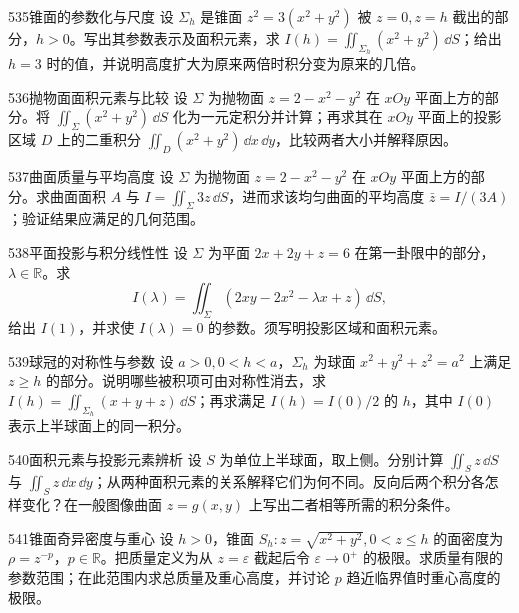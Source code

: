 \begin{exercise}{535}{锥面的参数化与尺度}
设 $\Sigma_h$ 是锥面 $z^2=3(x^2+y^2)$ 被 $z=0,z=h$ 截出的部分，$h>0$。写出其参数表示及面积元素，求 $I(h)=\iint_{\Sigma_h}(x^2+y^2)\,\dd S$；给出 $h=3$ 时的值，并说明高度扩大为原来两倍时积分变为原来的几倍。
\end{exercise}
\begin{exercise}{536}{抛物面面积元素与比较}
设 $\Sigma$ 为抛物面 $z=2-x^2-y^2$ 在 $xOy$ 平面上方的部分。将 $\iint_{\Sigma}(x^2+y^2)\,\dd S$ 化为一元定积分并计算；再求其在 $xOy$ 平面上的投影区域 $D$ 上的二重积分 $\iint_D(x^2+y^2)\,\dd x\,\dd y$，比较两者大小并解释原因。
\end{exercise}
\begin{exercise}{537}{曲面质量与平均高度}
设 $\Sigma$ 为抛物面 $z=2-x^2-y^2$ 在 $xOy$ 平面上方的部分。求曲面面积 $A$ 与 $I=\iint_{\Sigma}3z\,\dd S$，进而求该均匀曲面的平均高度 $\bar z=I/(3A)$；验证结果应满足的几何范围。
\end{exercise}
\begin{exercise}{538}{平面投影与积分线性性}
设 $\Sigma$ 为平面 $2x+2y+z=6$ 在第一卦限中的部分，$\lambda\in\mathbb R$。求
\[I(\lambda)=\iint_{\Sigma}(2xy-2x^2-\lambda x+z)\,\dd S,\]
给出 $I(1)$，并求使 $I(\lambda)=0$ 的参数。须写明投影区域和面积元素。
\end{exercise}
\begin{exercise}{539}{球冠的对称性与参数}
设 $a>0,0<h<a$，$\Sigma_h$ 为球面 $x^2+y^2+z^2=a^2$ 上满足 $z\ge h$ 的部分。说明哪些被积项可由对称性消去，求 $I(h)=\iint_{\Sigma_h}(x+y+z)\,\dd S$；再求满足 $I(h)=I(0)/2$ 的 $h$，其中 $I(0)$ 表示上半球面上的同一积分。
\end{exercise}
\begin{exercise}{540}{面积元素与投影元素辨析}
设 $S$ 为单位上半球面，取上侧。分别计算 $\iint_Sz\,\dd S$ 与 $\iint_Sz\,\dd x\,\dd y$；从两种面积元素的关系解释它们为何不同。反向后两个积分各怎样变化？在一般图像曲面 $z=g(x,y)$ 上写出二者相等所需的积分条件。
\end{exercise}
\begin{exercise}{541}{锥面奇异密度与重心}
设 $h>0$，锥面 $S_h:z=\sqrt{x^2+y^2},0<z\le h$ 的面密度为 $\rho=z^{-p}$，$p\in\mathbb R$。把质量定义为从 $z=\varepsilon$ 截起后令 $\varepsilon\to0^+$ 的极限。求质量有限的参数范围；在此范围内求总质量及重心高度，并讨论 $p$ 趋近临界值时重心高度的极限。
\end{exercise}
